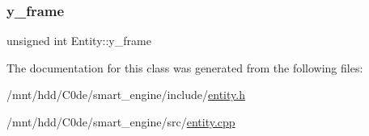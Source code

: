 \mbox{\label{classEntity_a778391410b1ff1f89fd6f06c8b636072}} 
\subsubsection{\texorpdfstring{y\+\_\+frame}{y\_frame}}
{\footnotesize\ttfamily unsigned int Entity\+::y\+\_\+frame}



The documentation for this class was generated from the following files\+:\begin{DoxyCompactItemize}
\item 
/mnt/hdd/\+C0de/smart\+\_\+engine/include/\hyperlink{entity_8h}{entity.\+h}\item 
/mnt/hdd/\+C0de/smart\+\_\+engine/src/\hyperlink{entity_8cpp}{entity.\+cpp}\end{DoxyCompactItemize}
